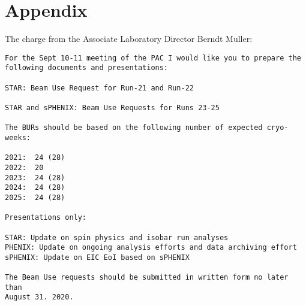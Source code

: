 \chapter{Appendix}
\label{chap:charge}

The charge from the Associate Laboratory Director Berndt Muller:

\begin{verbatim}
For the Sept 10-11 meeting of the PAC I would like you to prepare the 
following documents and presentations:

STAR: Beam Use Request for Run-21 and Run-22

STAR and sPHENIX: Beam Use Requests for Runs 23-25

The BURs should be based on the following number of expected cryo-weeks:

2021:  24 (28)
2022:  20
2023:  24 (28)
2024:  24 (28)
2025:  24 (28)

Presentations only:

STAR: Update on spin physics and isobar run analyses
PHENIX: Update on ongoing analysis efforts and data archiving effort
sPHENIX: Update on EIC EoI based on sPHENIX

The Beam Use requests should be submitted in written form no later than 
August 31. 2020.
\end{verbatim}